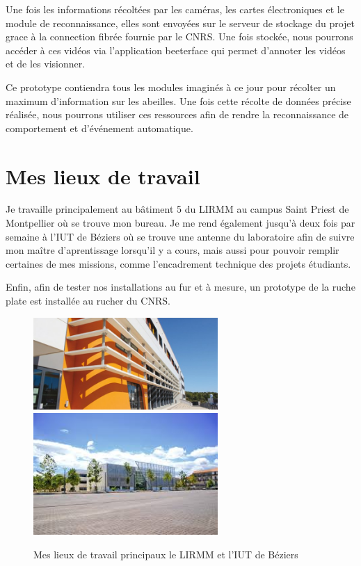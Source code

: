 \documentclass[11pt,french,a4paper]{report}
\begin{document}
{Une fois les informations récoltées par les caméras, les cartes électroniques et le module de reconnaissance, elles sont envoyées 
sur le serveur de stockage du projet grace à la connection fibrée fournie par le CNRS. Une fois stockée, nous pourrons accéder à ces 
vidéos via l'application beeterface qui permet d'annoter les vidéos et de les visionner. 

Ce prototype contiendra tous les modules imaginés à ce jour pour récolter un maximum d'information sur les abeilles. Une fois
cette récolte de données précise réalisée, nous pourrons utiliser ces ressources afin de rendre la reconnaissance de comportement 
et d'événement automatique. 


\section{Mes lieux de travail}

Je travaille principalement au bâtiment 5 du LIRMM au campus Saint Priest de Montpellier où se trouve mon bureau. 
Je me rend également jusqu'à deux fois par semaine à l'IUT de Béziers où se trouve une antenne du laboratoire afin de suivre
mon maître d'aprentissage lorsqu'il y a cours, mais aussi pour pouvoir remplir certaines de mes missions, comme l'encadrement
technique des projets étudiants. 

Enfin, afin de tester nos installations au fur et à mesure, un prototype de la ruche plate est installée au rucher du CNRS.


\begin{figure}[!h]
    \centering 
    \includegraphics[width=7cm]{./img/photo_lirmm.jpg} 
    \includegraphics[width=7cm]{./img/iut_beziers.jpeg} \\
    \caption{Mes lieux de travail principaux le LIRMM et l'IUT de Béziers}
    \label{lieux_travail_princ}
\end{figure}

}
\end{document}
